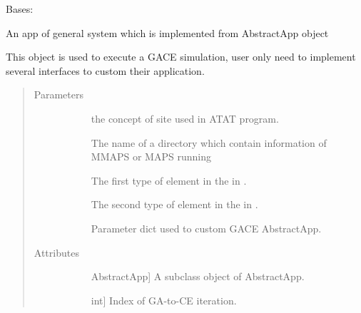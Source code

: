 \documentclass[letterpaper,10pt,english]{sphinxmanual}
\begin{document}
\begin{fulllineitems}
\label{\detokenize{pygace:pygace.general_gace.GeneralApp}}
Bases: {\hyperref[\detokenize{pygace:pygace.gace.AbstractApp}]{}}

An app of general system which is implemented from AbstractApp object

This object is used to execute a GACE simulation, user only need to
implement several interfaces to custom their application.
\begin{quote}\begin{description}
\item[{Parameters}] \leavevmode\begin{description}
\item[{}] \leavevmode
the concept of site used in ATAT program.

\item[{}] \leavevmode
The name of a directory which contain information of MMAPS or MAPS
running

\item[{}] \leavevmode
The first type of element in the  in .

\item[{}] \leavevmode
The second type of element in the  in .

\item[{}] \leavevmode
Parameter dict used to custom GACE AbstractApp.

\end{description}

\item[{Attributes}] \leavevmode\begin{description}
\item[{}] \leavevmode{[}AbstractApp{]}
A subclass object of AbstractApp.

\item[{}] \leavevmode{[}int{]}
Index of GA-to-CE iteration.

\end{description}


\end{description}
\end{quote}
\end{fulllineitems}
\end{document}
